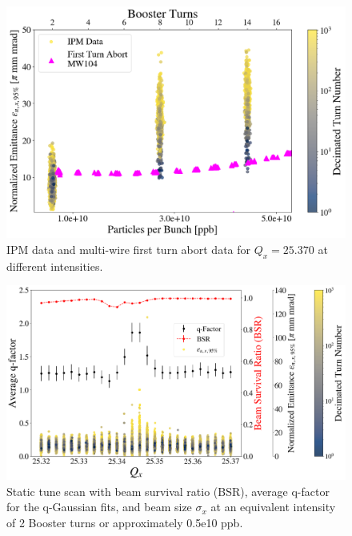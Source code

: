 \begin{figure}[H]
    \centering
    \includegraphics[width=\columnwidth]{chapter6/25370_scatter.png}
    \caption{IPM data and multi-wire first turn abort data for $Q_x=25.370$ at different intensities.}
    \label{fig:25370_scatter}
\end{figure}

\begin{figure}[H]
    \centering
    \includegraphics[width=\columnwidth]{chapter6/static2turns_emittance_dampersOFF.png}
    \caption{Static tune scan with beam survival ratio (BSR), average q-factor for the q-Gaussian fits, and beam size $\sigma_x$ at an equivalent intensity of 2 Booster turns or approximately 0.5e10 ppb.}
    \label{fig:static2_q}
\end{figure}

